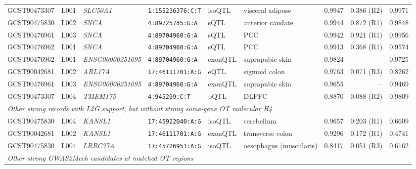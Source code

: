 \documentclass[11pt,a4paper]{article}
\begin{document}
\begin{landscape}
\begin{longtable}{@{}lllp{2.9cm}lp{3.1cm}rrr@{}}
GCST90473307 & L001 & \textit{SLC50A1} &
\texttt{1:155236376:C:T} &
isoQTL & visceral adipose &
0.9947 & 0.386 (R2) & 0.9971 \\

GCST90475830 & L002 & \textit{SNCA} &
\texttt{4:89725735:G:A} &
sQTL & anterior caudate &
0.9944 & 0.872 (R1) & 0.9848 \\

GCST90476961 & L003 & \textit{SNCA} &
\texttt{4:89704960:G:A} &
sQTL & PCC &
0.9942 & 0.921 (R1) & 0.9956 \\

GCST90476962 & L001 & \textit{SNCA} &
\texttt{4:89704960:G:A} &
sQTL & PCC &
0.9913 & 0.368 (R1) & 0.9574 \\

GCST90476962 & L001 &
\textit{ENSG00000251095} &
\texttt{4:89704960:G:A} &
exonQTL & suprapubic skin &
0.9824 & -- & 0.9725 \\

GCST90042681 & L002 & \textit{ARL17A} &
\texttt{17:46111701:A:G} &
eQTL & sigmoid colon &
0.9763 & 0.071 (R3) & 0.8262 \\

GCST90476961 & L003 &
\textit{ENSG00000251095} &
\texttt{4:89704960:G:A} &
exonQTL & suprapubic skin &
0.9655 & -- & 0.9469 \\

GCST90473307 & L004 & \textit{TMEM175} &
\texttt{4:945299:C:T} &
pQTL & DLPFC &
0.8870 & 0.088 (R2) & 0.9809 \\

\midrule
\multicolumn{9}{l}{
\textit{Other strong records with L2G support,
but without strong same-gene OT molecular H4}}\\
\midrule

GCST90475830 & L004 & \textit{KANSL1} &
\texttt{17:45922040:A:G} &
isoQTL & cerebellum &
0.9657 & 0.203 (R1) & 0.6609 \\

GCST90042681 & L002 & \textit{KANSL1} &
\texttt{17:46111701:A:G} &
exonQTL & transverse colon &
0.9296 & 0.172 (R1) & 0.4741 \\

GCST90475830 & L004 & \textit{LRRC37A} &
\texttt{17:45726951:A:G} &
isoQTL & oesophagus (muscularis) &
0.8417 & 0.051 (R3) & 0.6162 \\

\midrule
\multicolumn{9}{l}{
\textit{Other strong GWAS2Mech candidates
at matched OT regions}}\\
\midrule


\end{longtable}
\end{landscape}
\end{document}
